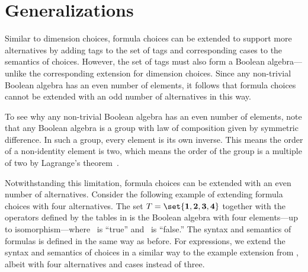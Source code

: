 \section{Generalizations}
\label{sec:ccgen}

Similar to dimension choices, formula choices can be extended to support more alternatives by adding tags to the set of tags and corresponding cases to the semantics of choices.
However, the set of tags must also form a Boolean algebra---unlike the corresponding extension for dimension choices.
Since any non-trivial Boolean algebra has an even number of elements, it follows that formula choices cannot be extended with an odd number of alternatives in this way.

To see why any non-trivial Boolean algebra has an even number of elements, note that any Boolean algebra is a group with law of composition given by symmetric difference.
In such a group, every element is its own inverse.
This means the order of a non-identity element is two, which means the order of the group is a multiple of two by Lagrange's theorem~\citep[p.~89]{dummitfoote}.

Notwithstanding this limitation, formula choices can be extended with an even number of alternatives.
Consider the following example of extending formula choices with four alternatives.
The set $\tagS = \set{\tagLL, \tagLR, \tagRL, \tagRR}$ together with the operators defined by the tables in  is the Boolean algebra with four elements---up to isomorphism---where \tagLL\ is ``true'' and \tagRR\ is ``false.''
The syntax and semantics of formulas is defined in the same way as before.
For expressions, we extend the syntax and semantics of choices in a similar way to the example extension from , albeit with four alternatives and cases instead of three.

